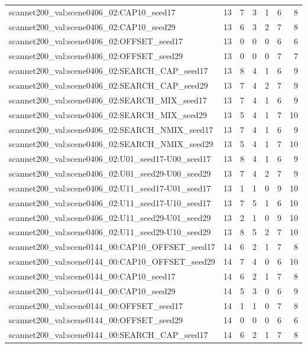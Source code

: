 \begin{table}[t]
\begin{tabular}{lrrrrrr}
scannet200\_val:scene0406\_02:CAP10\_seed17 & 13 & 7 & 3 & 1 & 6 & 8 \\
scannet200\_val:scene0406\_02:CAP10\_seed29 & 13 & 6 & 3 & 2 & 7 & 8 \\
scannet200\_val:scene0406\_02:OFFSET\_seed17 & 13 & 0 & 0 & 0 & 6 & 6 \\
scannet200\_val:scene0406\_02:OFFSET\_seed29 & 13 & 0 & 0 & 0 & 7 & 7 \\
scannet200\_val:scene0406\_02:SEARCH\_CAP\_seed17 & 13 & 8 & 4 & 1 & 6 & 9 \\
scannet200\_val:scene0406\_02:SEARCH\_CAP\_seed29 & 13 & 7 & 4 & 2 & 7 & 9 \\
scannet200\_val:scene0406\_02:SEARCH\_MIX\_seed17 & 13 & 7 & 4 & 1 & 6 & 9 \\
scannet200\_val:scene0406\_02:SEARCH\_MIX\_seed29 & 13 & 5 & 4 & 1 & 7 & 10 \\
scannet200\_val:scene0406\_02:SEARCH\_NMIX\_seed17 & 13 & 7 & 4 & 1 & 6 & 9 \\
scannet200\_val:scene0406\_02:SEARCH\_NMIX\_seed29 & 13 & 5 & 4 & 1 & 7 & 10 \\
scannet200\_val:scene0406\_02:U01\_seed17-U00\_seed17 & 13 & 8 & 4 & 1 & 6 & 9 \\
scannet200\_val:scene0406\_02:U01\_seed29-U00\_seed29 & 13 & 7 & 4 & 2 & 7 & 9 \\
scannet200\_val:scene0406\_02:U11\_seed17-U01\_seed17 & 13 & 1 & 1 & 0 & 9 & 10 \\
scannet200\_val:scene0406\_02:U11\_seed17-U10\_seed17 & 13 & 7 & 5 & 1 & 6 & 10 \\
scannet200\_val:scene0406\_02:U11\_seed29-U01\_seed29 & 13 & 2 & 1 & 0 & 9 & 10 \\
scannet200\_val:scene0406\_02:U11\_seed29-U10\_seed29 & 13 & 8 & 5 & 2 & 7 & 10 \\
scannet200\_val:scene0144\_00:CAP10\_OFFSET\_seed17 & 14 & 6 & 2 & 1 & 7 & 8 \\
scannet200\_val:scene0144\_00:CAP10\_OFFSET\_seed29 & 14 & 7 & 4 & 0 & 6 & 10 \\
scannet200\_val:scene0144\_00:CAP10\_seed17 & 14 & 6 & 2 & 1 & 7 & 8 \\
scannet200\_val:scene0144\_00:CAP10\_seed29 & 14 & 5 & 3 & 0 & 6 & 9 \\
scannet200\_val:scene0144\_00:OFFSET\_seed17 & 14 & 1 & 1 & 0 & 7 & 8 \\
scannet200\_val:scene0144\_00:OFFSET\_seed29 & 14 & 0 & 0 & 0 & 6 & 6 \\
scannet200\_val:scene0144\_00:SEARCH\_CAP\_seed17 & 14 & 6 & 2 & 1 & 7 & 8 \\

\end{tabular}
\end{table}
